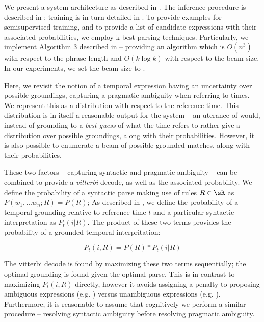 We present a system architecture as described in \needfig.
The inference procedure is described in ;
	training is in turn detailed in .
To provide examples for semisupervised training, and to provide a list of
	candidate expressions with their associated probabilities, we
	employ k-best parsing techniques.
Particularly, we implement Algorithm 3 described in 
	\cite{key:2005huang-parsing} -- providing an algorithm which is
	$O(n^3)$ with respect to the phrase length and $O(k\log k)$ with respect
	to the beam size.
In our experiments, we set the beam size to .

Here, we revisit the notion of a temporal expression having an uncertainty
	over possible groundings, capturing a pragmatic ambiguity when
	referring to times.
We represent this as a distribution with respect to the reference time.
This distribution is in itself a reasonable output for the system --
	an uterance of  would, instead of grounding to a 
	\textit{best guess} of what the time refers to rather give a distribution
	over possible groundings, along with their probabilities.
However, it is also possible to enumerate a beam of possible grounded
	matches, along with their probabilities.

These two factors -- capturing syntactic and pragmatic ambiguity --
	can be combined to provide a \textit{vitterbi} decode, as well as
	the associated probability.
We define the probability of a syntactic parse making use of rules $R \in \sR$ 
	as $P(w_1,\dots w_n; R) = P(R)$;
	As described in , we define the probability of a 
	temporal grounding relative to reference time $t$ and a particular
	syntactic interpretation as $P_t(i | R)$.
The product of these two terms provides the probability of a grounded temporal
	interpritation:

\begin{equation}
	P_t(i, R) = 
		P( R ) * P_t(i | R)
\label{eqn:prob}
\end{equation}

The vitterbi decode is found by maximizing these two terms sequentially;
	the optimal grounding is found given the optimal parse.
This is in contrast to maximizing $P_t(i,R)$ directly, however it avoids
	assigning a penalty to proposing ambiguous expressions (e.g. )
	versus unambiguous expressions (e.g. ).
Furthermore, it is reasonable to assume that cognitively we perform a
	similar procedure -- resolving syntactic ambiguity before resolving
	pragmatic ambiguity.


